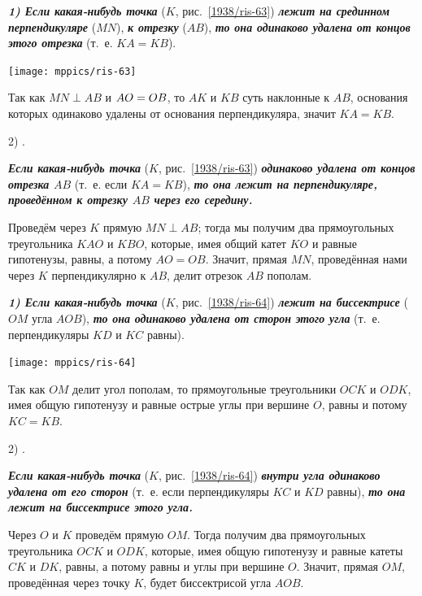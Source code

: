 \documentclass[oneside]{book}
\begin{document}
\setlength{\columnseprule}{.4pt}
\begin{paracol}{2}

{\sloppy

\textbf{\emph{1) Если какая-нибудь точка}} ($K$, рис.~\ref{1938/ris-63}) \textbf{\emph{лежит на срединном перпендикуляре}} ($MN$), \textbf{\emph{к отрезку}} ($AB$), \textbf{\emph{то она одинаково удалена от концов этого отрезка}} (т.~е. $KA=KB$).

{\centering
\texttt{[image: mppics/ris-63]}
\label{1938/ris-63}
\addtocounter{figure}{1}
}

\medskip

Так как $MN\perp AB$ и $AO\z=OB$, то $AK$ и $KB$ суть наклонные к $AB$, основания которых одинаково удалены от основания перпендикуляра, значит $KA=KB$.

2) .

\textbf{\emph{Если какая-нибудь точка}} ($K$, рис.~\ref{1938/ris-63}) \textbf{\emph{одинаково удалена от концов отрезка $AB$}} (т.~е. если $KA=KB$), \textbf{\emph{то она лежит на перпендикуляре, проведённом к отрезку $AB$ через его середину.}}

Проведём через $K$ прямую $MN\perp AB$;
тогда мы получим два прямоугольных треугольника $KAO$ и $KBO$, которые, имея общий катет $KO$ и равные гипотенузы, равны, а потому $AO=OB$.
Значит, прямая $MN$, проведённая нами через $K$ перпендикулярно к $AB$, делит отрезок $AB$ пополам.

}

\switchcolumn

{\sloppy

\textbf{\emph{1) Если какая-нибудь точка}} ($K$, рис.~\ref{1938/ris-64}) \textbf{\emph{лежит на биссектрисе}} ($OM$ угла $AOB$), \textbf{\emph{то она одинаково удалена от сторон этого угла}} (т.~е. перпендикуляры $KD$ и $KC$ равны).



{\centering
\addtocounter{figure}{1}
\texttt{[image: mppics/ris-64]}
\label{1938/ris-64}
\addtocounter{figure}{1}
}

\medskip

Так как $OM$ делит угол пополам, то прямоугольные треугольники $OCK$ и $ODK$, имея общую гипотенузу и равные острые углы при вершине $O$, равны и потому $KC=KB$.

2) .

\textbf{\emph{Если какая-нибудь точка}} ($K$, рис.~\ref{1938/ris-64}) \textbf{\emph{внутри угла одинаково удалена от его сторон}} (т.~е. если перпендикуляры $KC$ и $KD$ равны), \textbf{\emph{то она лежит на биссектрисе этого угла.}}

Через $O$ и $K$ проведём прямую $OM$.
Тогда получим два прямоугольных треугольника $OCK$ и $ODK$, которые, имея общую гипотенузу и равные катеты $CK$ и $DK$, равны, а потому равны и углы при вершине $O$.
Значит, прямая $OM$, проведённая через точку $K$, будет биссектрисой угла $AOB$.



}
\end{paracol}
\end{document}
